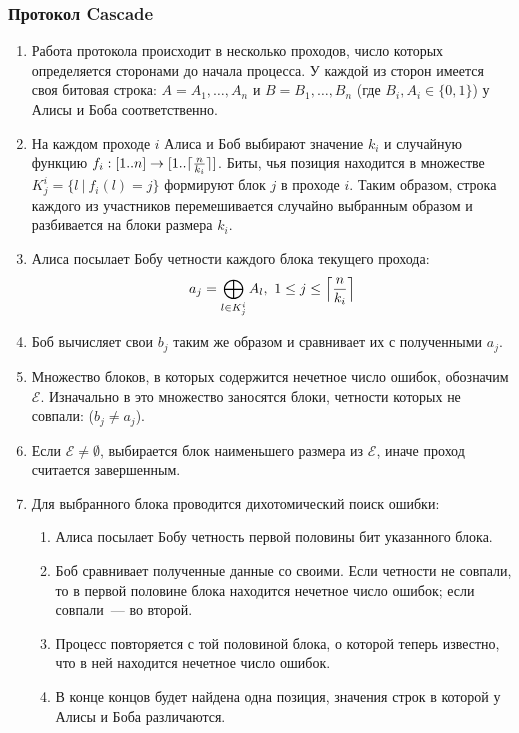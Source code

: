 \subsubsection{Протокол Cascade}
\begin{enumerate}
  \item Работа протокола происходит в несколько проходов, число которых определяется сторонами до начала процесса. У каждой из сторон имеется своя битовая строка: $A = A_1,\dots,A_n$ и $B = B_1,\dots,B_n$ (где $B_i,A_i \in \{0, 1\}$) у Алисы и Боба соответственно.
  
  \item На каждом проходе $i$ Алиса и Боб выбирают значение $k_i$ и случайную функцию $f_i: [1..n]\rightarrow[1..\ceil{\frac{n}{k_i}}]$. Биты, чья позиция находится в множестве $K^i_j = \{l~|~f_i(l) = j\}$ формируют блок $j$ в проходе $i$. Таким образом, строка каждого из участников перемешивается случайно выбранным образом и разбивается на блоки размера $k_i$.
  
  \item Алиса посылает Бобу четности каждого блока текущего прохода: 
  $$ a_j = \bigoplus_{l \in K^i_j} A_l,~ 1 \leq j \leq \ceil[\Big]{\frac{n}{k_i}} $$
  
  \item Боб вычисляет свои $b_j$ таким же образом и сравнивает их с полученными $a_j$. 
  
  \item Множество блоков, в которых содержится нечетное число ошибок, обозначим $\mathcal{E}$.
  Изначально в это множество заносятся блоки, четности которых не совпали: ($b_j \neq a_j $).
  
  \item\label{while_condition} Если $\mathcal{E} \neq \emptyset$, выбирается блок наименьшего размера из $\mathcal{E}$, иначе проход считается завершенным.
  
  \item Для выбранного блока проводится дихотомический поиск ошибки:
  \begin{enumerate}
    \item Алиса посылает Бобу четность первой половины бит указанного блока.
    \item Боб сравнивает полученные данные со своими. Если четности не совпали, то в первой половине блока находится нечетное число ошибок; если совпали~--- во второй.
    \item Процесс повторяется с той половиной блока, о которой теперь известно, что в ней находится нечетное число ошибок.
    \item В конце концов будет найдена одна позиция, значения строк в которой у Алисы и Боба различаются.
  \end{enumerate}
  

\end{enumerate}
